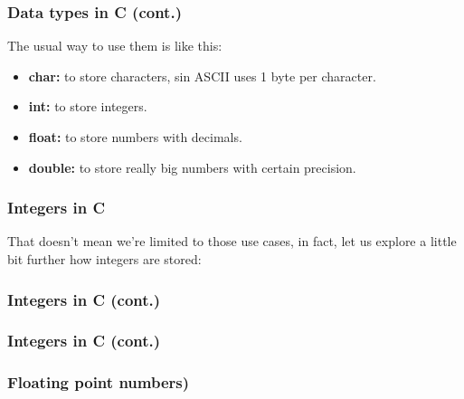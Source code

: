 \documentclass[aspectratio=169]{beamer}
\begin{document}
\begin{frame}
  \frametitle{Data types in C (cont.)}
  The usual way to use them is like this:
  \begin{itemize}
    \item \textbf{char:} to store characters, sin ASCII uses 1 byte per character.
    \item \textbf{int:} to store integers.
    \item \textbf{float:} to store numbers with decimals.
    \item \textbf{double:} to store really big numbers with certain precision.
  \end{itemize}  
\end{frame}

\begin{frame}
  \frametitle{Integers in C}
  That doesn't mean we're limited to those use cases, in fact, let us explore a little bit further how integers are stored:
\end{frame}

\begin{frame}
  \frametitle{Integers in C (cont.)}
\end{frame}

\begin{frame}
  \frametitle{Integers in C (cont.)}
\end{frame}

\begin{frame}
  \frametitle{Floating point numbers)}

\end{frame}
\end{document}
